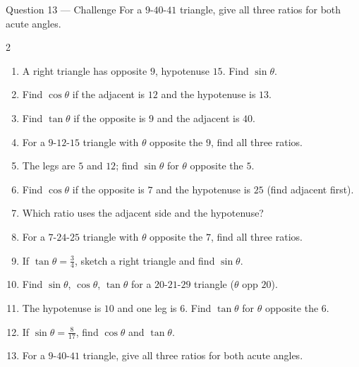 \documentclass[11pt]{article}
\begin{document}
\begin{qbox}{Question 13 --- Challenge}
For a $9$-$40$-$41$ triangle, give all three ratios for both acute angles.\workspace{3.0cm}
\end{qbox}

\clearpage
{}

\begin{recapbox}
\begin{multicols}{2}
\small
\begin{enumerate}[leftmargin=*,itemsep=3pt]
  \item A right triangle has opposite $9$, hypotenuse $15$. Find $\sin\theta$.
  \item Find $\cos\theta$ if the adjacent is $12$ and the hypotenuse is $13$.
  \item Find $\tan\theta$ if the opposite is $9$ and the adjacent is $40$.
  \item For a $9$-$12$-$15$ triangle with $\theta$ opposite the $9$, find all three ratios.
  \item The legs are $5$ and $12$; find $\sin\theta$ for $\theta$ opposite the $5$.
  \item Find $\cos\theta$ if the opposite is $7$ and the hypotenuse is $25$ (find adjacent first).
  \item Which ratio uses the adjacent side and the hypotenuse?
  \item For a $7$-$24$-$25$ triangle with $\theta$ opposite the $7$, find all three ratios.
  \item If $\tan\theta=\tfrac34$, sketch a right triangle and find $\sin\theta$.
  \item Find $\sin\theta$, $\cos\theta$, $\tan\theta$ for a $20$-$21$-$29$ triangle ($\theta$ opp $20$).
  \item The hypotenuse is $10$ and one leg is $6$. Find $\tan\theta$ for $\theta$ opposite the $6$.
  \item If $\sin\theta=\tfrac{8}{17}$, find $\cos\theta$ and $\tan\theta$.
  \item For a $9$-$40$-$41$ triangle, give all three ratios for both acute angles.
\end{enumerate}
\end{multicols}
\end{recapbox}
\end{document}
